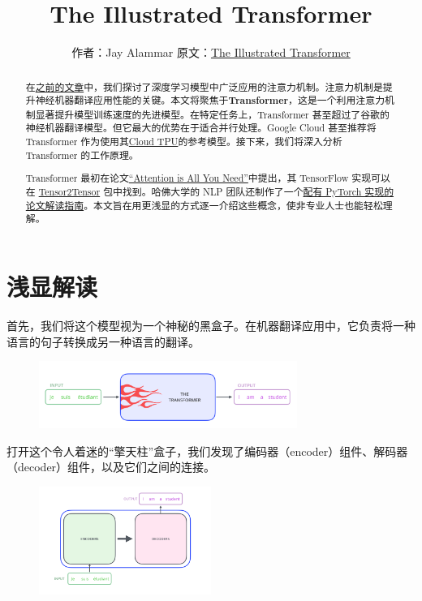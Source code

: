\documentclass[cn,hazy,blue,10pt,normal]{elegantnote}
\title{The Illustrated Transformer}
\author{作者：Jay Alammar \qquad 原文：\href{https://jalammar.github.io/illustrated-transformer/}{The Illustrated Transformer}}
\institute{}
\begin{document}
	


\maketitle

\begin{abstract}
	在\href{https://jalammar.github.io/visualizing-neural-machine-translation-mechanics-of-seq2seq-models-with-attention/}{之前的文章}中，我们探讨了深度学习模型中广泛应用的注意力机制。注意力机制是提升神经机器翻译应用性能的关键。本文将聚焦于\textbf{Transformer}，这是一个利用注意力机制显著提升模型训练速度的先进模型。在特定任务上，Transformer 甚至超过了谷歌的神经机器翻译模型。但它最大的优势在于适合并行处理。Google Cloud 甚至推荐将 Transformer 作为使用其\href{https://cloud.google.com/tpu/}{Cloud TPU}的参考模型。接下来，我们将深入分析 Transformer 的工作原理。
	
	Transformer 最初在论文\href{https://arxiv.org/abs/1706.03762}{“Attention is All You Need”}中提出，其 TensorFlow 实现可以在 \href{https://github.com/tensorflow/tensor2tensor}{Tensor2Tensor} 包中找到。哈佛大学的 NLP 团队还制作了一个\href{http://nlp.seas.harvard.edu/2018/04/03/attention.html}{配有 PyTorch 实现的论文解读指南}。本文旨在用更浅显的方式逐一介绍这些概念，使非专业人士也能轻松理解。
\end{abstract}


\section{浅显解读}

首先，我们将这个模型视为一个神秘的黑盒子。在机器翻译应用中，它负责将一种语言的句子转换成另一种语言的翻译。
\begin{figure}[h]
	\centering
	\includegraphics[width=0.75\textwidth]{image/the_transformer_3.png}
\end{figure}

打开这个令人着迷的“擎天柱”盒子，我们发现了编码器（encoder）组件、解码器（decoder）组件，以及它们之间的连接。
\begin{figure}[h]
	\centering
	\includegraphics[width=0.5\textwidth]{image/The_transformer_encoders_decoders.png}
\end{figure}
\end{document}
